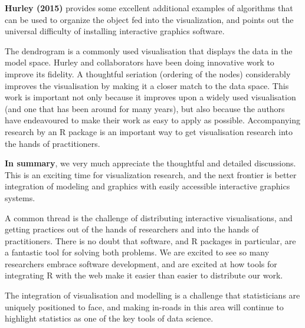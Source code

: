 \documentclass[preprint]{imsart}
\begin{document}

\textbf{Hurley (2015)} provides some excellent additional examples of algorithms that can be used to organize the object fed into the visualization, and points out the universal difficulty of installing interactive graphics software.

The dendrogram is a commonly used visualisation that displays the data in the model space. Hurley and collaborators have been doing innovative work to improve its fidelity. A thoughtful seriation (ordering of the nodes) considerably improves the visualisation by making it a closer match to the data space. This work is important not only because it improves upon a widely used visualisation (and one that has been around for many years), but also because the authors have endeavoured to make their work as easy to apply as possible. Accompanying research by an R package is an important way to get visualisation research into the hands of practitioners.


\textbf{In summary}, we very much appreciate the thoughtful and detailed discussions. This is an exciting time for visualization research, and the next frontier is better integration of modeling and graphics with easily accessible interactive graphics systems.

A common thread is the challenge of distributing interactive visualisations, and getting practices out of the hands of researchers and into the hands of practitioners. There is no doubt that software, and R packages in particular, are a fantastic tool for solving both problems. We are excited to see so many researchers embrace software development, and are excited at how tools for integrating R with the web make it easier than easier to distribute our work.

The integration of visualisation and modelling is a challenge that statisticians are uniquely positioned to face, and making in-roads in this area will continue to highlight statistics as one of the key tools of data science.



\end{document}
